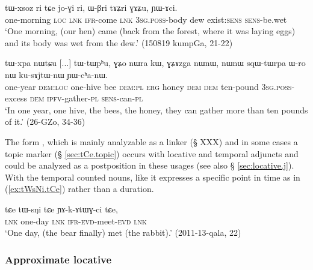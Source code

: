 \begin{exe}
\ex \label{ex:tWxsoz.ri}
\gll tɯ-xsoz ri tɕe jo-ɣi ri, ɯ-βri tɤʑri ɣɤʑu, ɲɯ-ɤci. \\
one-morning \textsc{loc} \textsc{lnk} \textsc{ifr}-come \textsc{lnk} \textsc{3sg}.\textsc{poss}-body dew exist:\textsc{sens} \textsc{sens}-be.wet \\
\glt `One morning, (our hen) came (back from the forest, where it was laying eggs) and its body was wet from the dew.' (150819 kumpGa, 21-22)
\end{exe}

\begin{exe}
\ex \label{ex:tWxpa.nWtCu}
\gll  tɯ-xpa nɯtɕu [...] tɯ-tɯpʰu, ɣʑo nɯra kɯ, ɣʑɤzga nɯnɯ, nɯnɯ sqɯ-tɯrpa ɯ-ro nɯ ku-sɤjtɯ-nɯ ɲɯ-cʰa-nɯ. \\
one-year \textsc{dem}:\textsc{loc} { } one-hive bee \textsc{dem}:\textsc{pl} \textsc{erg} honey \textsc{dem} \textsc{dem} ten-pound \textsc{3sg}.\textsc{poss}-excess \textsc{dem} \textsc{ipfv}-gather-\textsc{pl} \textsc{sens}-can-\textsc{pl} \\
\glt  `In one year, one hive, the bees, the honey, they can gather more than ten pounds of it.' (26-GZo, 34-36)
\end{exe}

The form , which  is mainly analyzable as a linker (§ XXX) and in some cases a topic marker (§ \ref{sec:tCe.topic}) occurs with locative and temporal adjuncts and could be analyzed as a postposition in these usages (see also § \ref{sec:locative.j}). With the temporal counted nouns, like  it expresses a specific point in time as in (\ref{ex:tWsNi.tCe}) rather than a duration.

 \begin{exe}
\ex \label{ex:tWsNi.tCe}
\gll   tɕe tɯ-sŋi tɕe ɲɤ-k-ɤtɯɣ-ci tɕe, \\
\textsc{lnk} one-day \textsc{lnk} \textsc{ifr}-\textsc{evd}-meet-\textsc{evd} \textsc{lnk} \\
\glt  `One day, (the bear finally) met (the rabbit).' (2011-13-qala, 22)
\end{exe}


\subsubsection{Approximate locative} \label{sec:approximate.locative}

